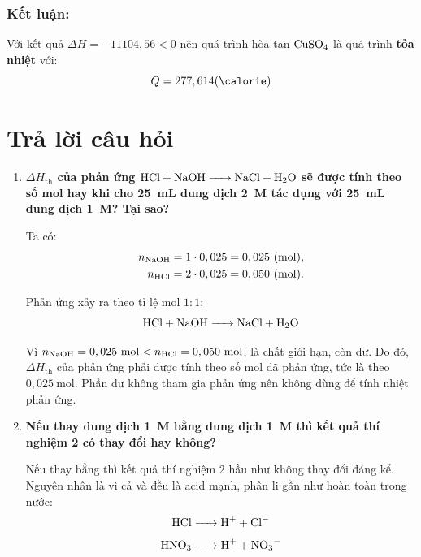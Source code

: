    \subsubsection{Kết luận:}
        Với kết quả \(\Delta H = -11104,56 < 0\) nên quá trình hòa tan \(\ce{CuSO4}\) là quá trình \textbf{tỏa nhiệt} với:
        \begin{equation}
            Q = 277,614 (\si{\calorie})
        \end{equation}

\section{Trả lời câu hỏi}

\begin{enumerate}
    \item \textbf{\(\Delta H_{\mathrm{th}}\) của phản ứng \(\ce{HCl + NaOH -> NaCl + H2O}\) sẽ được tính theo số mol  hay  khi cho \SI{25}{\milli\liter} dung dịch  \SI{2}{M} tác dụng với \SI{25}{\milli\liter} dung dịch  \SI{1}{M}? Tại sao?}

        Ta có:
        \begin{equation}
            \begin{aligned}
                n_{\ce{NaOH}} &= 1 \cdot 0,025 = 0,025\ (\si{\mole}), \\
                n_{\ce{HCl}} &= 2 \cdot 0,025 = 0,050\ (\si{\mole}).
            \end{aligned}
        \end{equation}

        Phản ứng xảy ra theo tỉ lệ mol \(1:1\):
        \begin{equation}
            \ce{HCl + NaOH -> NaCl + H2O}
        \end{equation}

        Vì \(n_{\ce{NaOH}} = 0,025\ \si{\mole} < n_{\ce{HCl}} = 0,050\ \si{\mole}\),  là chất giới hạn, còn  dư. Do đó, \(\Delta H_{\mathrm{th}}\) của phản ứng phải được tính theo số mol  đã phản ứng, tức là theo \(0,025\ \si{\mole}\). Phần  dư không tham gia phản ứng nên không dùng để tính nhiệt phản ứng.

    \item \textbf{Nếu thay dung dịch  \SI{1}{M} bằng dung dịch  \SI{1}{M} thì kết quả thí nghiệm 2 có thay đổi hay không?}

        Nếu thay  bằng  thì kết quả thí nghiệm 2 hầu như không thay đổi đáng kể. Nguyên nhân là vì cả  và  đều là acid mạnh, phân li gần như hoàn toàn trong nước:
        \begin{equation}
            \ce{HCl -> H+ + Cl-}
        \end{equation}
        \begin{equation}
            \ce{HNO3 -> H+ + NO3-}
        \end{equation}


\end{enumerate}
